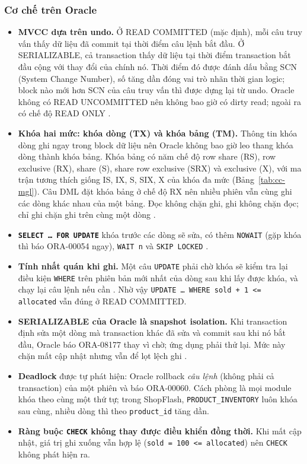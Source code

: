 \subsubsection{Cơ chế trên Oracle}\label{sec:cc-oracle}

\begin{itemize}
  \item \textbf{MVCC dựa trên undo.} Ở READ COMMITTED (mặc định), mỗi câu truy vấn thấy dữ liệu đã commit tại thời điểm câu lệnh bắt đầu. Ở SERIALIZABLE, cả transaction thấy dữ liệu tại thời điểm transaction bắt đầu cộng với thay đổi của chính nó. Thời điểm đó được đánh dấu bằng SCN (System Change Number), số tăng dần đóng vai trò nhãn thời gian logic; block nào mới hơn SCN của câu truy vấn thì được dựng lại từ undo. Oracle không có READ UNCOMMITTED nên không bao giờ có dirty read; ngoài ra có chế độ READ ONLY \cite{cc-oracle-concepts, cc-oracle-set-transaction}.
  \item \textbf{Khóa hai mức: khóa dòng (TX) và khóa bảng (TM).} Thông tin khóa dòng ghi ngay trong block dữ liệu nên Oracle không bao giờ leo thang khóa dòng thành khóa bảng. Khóa bảng có năm chế độ row share (RS), row exclusive (RX), share (S), share row exclusive (SRX) và exclusive (X), với ma trận tương thích giống IS, IX, S, SIX, X của khóa đa mức (Bảng~\ref{tab:cc-mgl}). Câu DML đặt khóa bảng ở chế độ RX nên nhiều phiên vẫn cùng ghi các dòng khác nhau của một bảng. Đọc không chặn ghi, ghi không chặn đọc; chỉ ghi chặn ghi trên cùng một dòng \cite{cc-oracle-concepts}.
  \item \textbf{\texttt{SELECT \ldots{} FOR UPDATE}} khóa trước các dòng sẽ sửa, có thêm \texttt{NOWAIT} (gặp khóa thì báo ORA-00054 ngay), \texttt{WAIT n} và \texttt{SKIP LOCKED} \cite{cc-oracle-select}.
  \item \textbf{Tính nhất quán khi ghi.} Một câu \texttt{UPDATE} phải chờ khóa sẽ kiểm tra lại điều kiện \texttt{WHERE} trên phiên bản mới nhất của dòng sau khi lấy được khóa, và chạy lại câu lệnh nếu cần \cite{cc-oracle-concepts}. Nhờ vậy \texttt{UPDATE \ldots{} WHERE sold + 1 <= allocated} vẫn đúng ở READ COMMITTED.
  \item \textbf{SERIALIZABLE của Oracle là snapshot isolation.} Khi transaction định sửa một dòng mà transaction khác đã sửa và commit sau khi nó bắt đầu, Oracle báo ORA-08177 thay vì chờ; ứng dụng phải thử lại. Mức này chặn mất cập nhật nhưng vẫn để lọt lệch ghi \cite{cc-berenson1995}.
  \item \textbf{Deadlock} được tự phát hiện: Oracle rollback \emph{câu lệnh} (không phải cả transaction) của một phiên và báo ORA-00060. Cách phòng là mọi module khóa theo cùng một thứ tự; trong ShopFlash, \texttt{PRODUCT\_INVENTORY} luôn khóa sau cùng, nhiều dòng thì theo \texttt{product\_id} tăng dần.
  \item \textbf{Ràng buộc \texttt{CHECK} không thay được điều khiển đồng thời.} Khi mất cập nhật, giá trị ghi xuống vẫn hợp lệ (\texttt{sold = 100 <= allocated}) nên \texttt{CHECK} không phát hiện ra.
\end{itemize}

